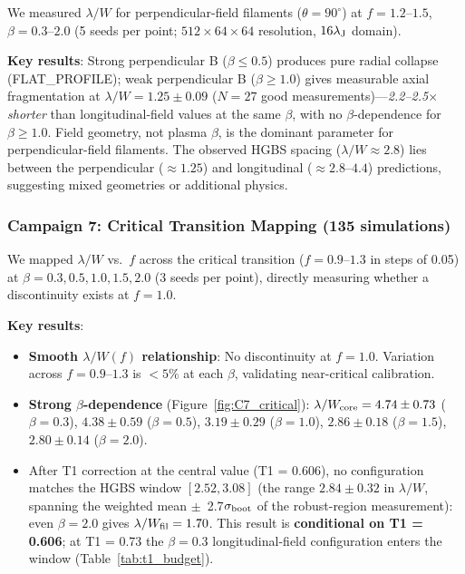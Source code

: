\documentclass[twoside,twocolumn]{mnras}
\begin{document}
We measured $\lambda/W$ for perpendicular-field filaments ($\theta = 90^\circ$) at
$f = 1.2$--$1.5$, $\beta = 0.3$--$2.0$ (5 seeds per point; $512\times64\times64$ resolution,
$16\lambda_{\rm J}$ domain).

\textbf{Key results}: Strong perpendicular B ($\beta \leq 0.5$) produces pure radial collapse
(FLAT\_PROFILE); weak perpendicular B ($\beta \geq 1.0$) gives measurable axial fragmentation
at $\lambda/W = 1.25 \pm 0.09$ ($N = 27$ good measurements)---\textit{2.2--2.5$\times$
shorter} than longitudinal-field values at the same $\beta$, with no $\beta$-dependence
for $\beta \geq 1.0$. Field geometry, not plasma $\beta$, is the dominant parameter for
perpendicular-field filaments. The observed HGBS spacing ($\lambda/W \approx 2.8$) lies
between the perpendicular (${\approx}1.25$) and longitudinal (${\approx}2.8$--$4.4$)
predictions, suggesting mixed geometries or additional physics.

\subsubsection{Campaign 7: Critical Transition Mapping (135 simulations)}

We mapped $\lambda/W$ vs.\ $f$ across the critical transition ($f = 0.9$--$1.3$ in
steps of 0.05) at $\beta = 0.3, 0.5, 1.0, 1.5, 2.0$ (3 seeds per point), directly
measuring whether a discontinuity exists at $f = 1.0$.

\textbf{Key results}:
\begin{itemize}
    \item \textbf{Smooth $\lambda/W(f)$ relationship}: No discontinuity at $f = 1.0$.
    Variation across $f = 0.9$--$1.3$ is $<5\%$ at each $\beta$, validating
    near-critical calibration.
    \item \textbf{Strong $\beta$-dependence} (Figure~\ref{fig:C7_critical}):
    $\lambda/W_{\rm core} = 4.74 \pm 0.73$ ($\beta = 0.3$), $4.38 \pm 0.59$ ($\beta = 0.5$),
    $3.19 \pm 0.29$ ($\beta = 1.0$), $2.86 \pm 0.18$ ($\beta = 1.5$),
    $2.80 \pm 0.14$ ($\beta = 2.0$).
    \item After T1 correction at the central value (T1 = 0.606), no configuration
    matches the HGBS window $[2.52, 3.08]$ (the range $2.84\pm 0.32$ in $\lambda/W$, spanning the weighted mean $\pm$~2.7$\sigma_{\rm boot}$ of the robust-region measurement): even $\beta = 2.0$ gives
    $\lambda/W_{\rm fil} = 1.70$. This result is \textbf{conditional on T1 = 0.606};
    at T1 = 0.73 the $\beta = 0.3$ longitudinal-field configuration enters the window
    (Table~\ref{tab:t1_budget}).
\end{itemize}
\end{document}
